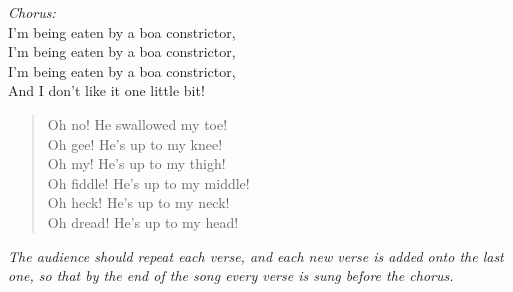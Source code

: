 
\begin{center}
\textit{Chorus:} \\
I'm being eaten by a boa constrictor, \\
I'm being eaten by a boa constrictor, \\
I'm being eaten by a boa constrictor, \\
And I don't like it one little bit! \\
\end{center}

\begin{verse}
Oh no! He swallowed my toe! \\

Oh gee! He's up to my knee! \\

Oh my! He's up to my thigh! \\

Oh fiddle! He's up to my middle! \\

Oh heck! He's up to my neck! \\

Oh dread! He's up to my head! \\
\end{verse}

\textit{The audience should repeat each verse, and each new verse is added onto the last one, so that by the end of the song every verse is sung before the chorus.}
